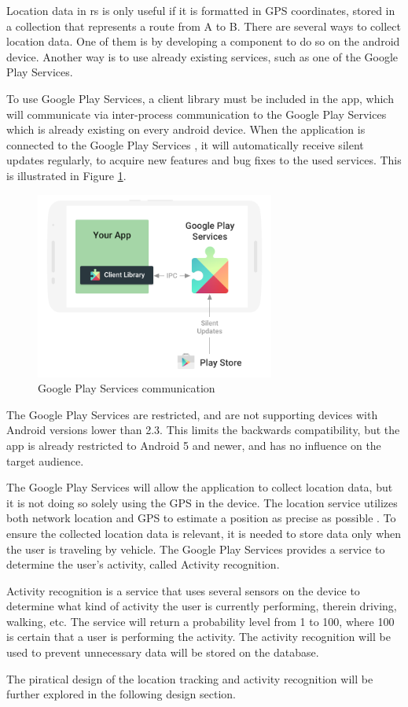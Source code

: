 Location data in \gls{rs} is only useful if it is formatted in GPS coordinates, stored in a collection that represents a route from A to B.
There are several ways to collect location data. 
One of them is by developing a component to do so on the android device. 
Another way is to use already existing services, such as one of the Google Play Services.


To use Google Play Services, a client library must be included in the app, which will communicate via inter-process communication to the Google Play Services which is already existing on every android device. 
When the application is connected to the Google Play Services \cite{GapiOverview}, it will automatically receive silent updates regularly, to acquire new features and bug fixes to the used services. 
This is illustrated in Figure \ref{fig:gapifigure}.

\begin{figure}[h]
	\centering
	\includegraphics[width=0.7\textwidth]{figures/play-services-diagram.png}
	\caption{Google Play Services communication\cite{GapiFigure}}
	\label{fig:gapifigure}
\end{figure}

The Google Play Services are restricted, and are not supporting devices with Android versions lower than 2.3. 
This limits the backwards compatibility, but the app is already restricted to Android 5 and newer, and has no influence on the target audience.

The Google Play Services will allow the application to collect location data, but it is not doing so solely using the GPS in the device. 
The location service utilizes both network location and GPS to estimate a position as precise as possible \cite{GapiLocation}. 
To ensure the collected location data is relevant, it is needed to store data only when the user is traveling by vehicle.
The Google Play Services provides a service to determine the user's activity, called Activity recognition. 

Activity recognition is a service that uses several sensors on the device to determine what kind of activity the user is currently performing, therein driving, walking, etc.
The service will return a probability level from 1 to 100, where 100 is certain that a user is performing the activity.
The activity recognition will be used to prevent unnecessary data will be stored on the database. 


The piratical design of the location tracking and activity recognition will be further explored in the following design section.